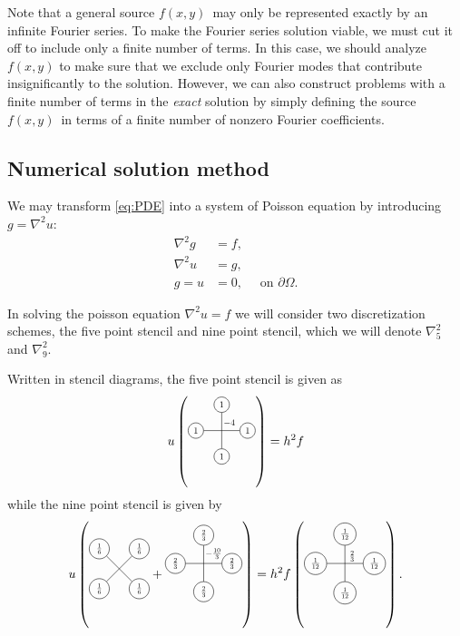 Note that a general source $f(x,y)$ may only be represented exactly by an infinite Fourier series.
To make the Fourier series solution viable, we must cut it off to include only a finite number of terms.
In this case, we should analyze $f(x,y)$ to make sure that we exclude only Fourier modes that contribute insignificantly to the solution.
However, we can also construct problems with a finite number of terms in the \emph{exact} solution by simply defining the source $f(x,y)$ in terms of a finite number of nonzero Fourier coefficients.


\subsection{Numerical solution method}

We may transform \eqref{eq:PDE} into a system of Poisson equation by introducing $g = \nabla^2 u$:
\begin{align}\label{eq:PDE-poisson}
  \nabla^2g &= f,\\
  \nabla^2u &= g,\\
  g = u &= 0,\quad \text{ on } \partial \Omega.
\end{align}


In solving the poisson equation $\nabla^2 u = f$ we will consider two discretization schemes, the five point stencil and nine point stencil, which we will denote $\nabla_5^2$ and $\nabla_9^2$.

\newcommand{\crossStencil}[5]{%
  \begin{tikzpicture}[scale=0.5,baseline=1mm, every node/.style={scale=0.7}, nodes={draw, circle}]
    \draw node[below]{$#1$} (0,0) -- (0,2) node[above]{$#2$};
    \draw (-1, 1) node[left]{$#3$} -- (1, 1) node[right]{$#4$};
    \node[above right, draw=none] at (0,1) {$#5$};
  \end{tikzpicture}
}

\newcommand{\xStencil}[4]{%
  \begin{tikzpicture}[scale=0.5,baseline=1mm, every node/.style={scale=0.7}, nodes={draw, circle}]
    \draw node[below left]{$#1$} (0,0) -- (1.41, 1.41) node[above right]{$#2$};
    \draw (0, 1.41) node[above left]{$#3$} -- (1.41, 0) node[below right]{$#4$};
  \end{tikzpicture}
}

Written in stencil diagrams, the five point stencil is given as \cite{part2}
$$
u \left(\crossStencil{1}{1}{1}{1}{-4}\right) = h^2 f
$$
while the nine point stencil is given by
$$
u
\left(
\xStencil{\frac16}{\frac16}{\frac16}{\frac16}
+
\crossStencil{\frac23}{\frac23}{\frac23}{\frac23}{-\frac{10}{3}}
\right)
=
h^2
f
\left(
\crossStencil{\frac1{12}}{\frac1{12}}{\frac1{12}}{\frac1{12}}{\frac23}
\right).
$$


